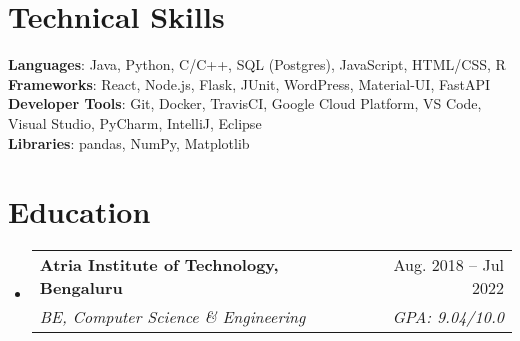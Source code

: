 \documentclass[letterpaper,11pt]{article}
\makeatletter
\newcommand{\resumeSubheading}[4]{
  \vspace{-2pt}\item
    \begin{tabular*}{0.97\textwidth}[t]{l@{\extracolsep{\fill}}r}
      \textbf{#1} & #2 \\
      \textit{\small#3} & \textit{\small #4} \\
    \end{tabular*}\vspace{-7pt}
}
\newcommand{\resumeSubHeadingListStart}{\begin{itemize}[leftmargin=0.15in, label={}]}
\newcommand{\resumeSubHeadingListEnd}{\end{itemize}}
\makeatother
\begin{document}
\section{Technical Skills}
 \begin{itemize}[leftmargin=0.15in, label={}]
    \small{\item{
     \textbf{Languages}{: Java, Python, C/C++, SQL (Postgres), JavaScript, HTML/CSS, R} \\
     \textbf{Frameworks}{: React, Node.js, Flask, JUnit, WordPress, Material-UI, FastAPI} \\
     \textbf{Developer Tools}{: Git, Docker, TravisCI, Google Cloud Platform, VS Code, Visual Studio, PyCharm, IntelliJ, Eclipse} \\
     \textbf{Libraries}{: pandas, NumPy, Matplotlib}
    }}
 \end{itemize}

\section{Education}
  \resumeSubHeadingListStart
    \resumeSubheading
      {Atria Institute of Technology, Bengaluru}{Aug. 2018 -- Jul 2022}
      {BE, Computer Science \& Engineering}{GPA: 9.04/10.0}
  \resumeSubHeadingListEnd

\end{document}

